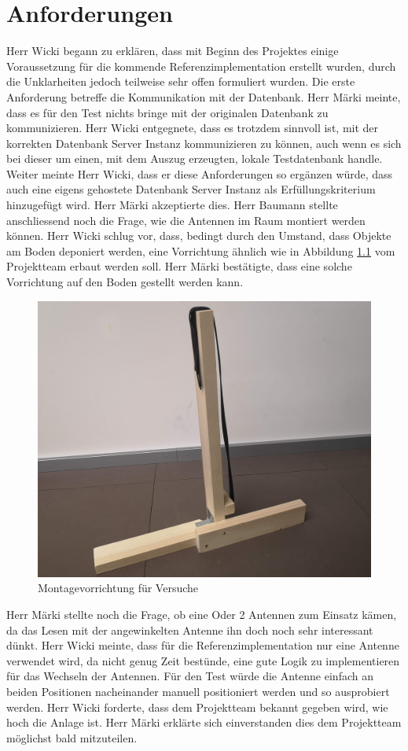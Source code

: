 \documentclass[parskip=full, a4paper]{scrreprt}
\begin{document}
\chapter{Anforderungen}
Herr Wicki begann zu erklären, dass mit Beginn des Projektes einige Voraussetzung für die kommende Referenzimplementation erstellt wurden, durch die Unklarheiten jedoch teilweise sehr offen formuliert wurden. Die erste Anforderung betreffe die Kommunikation mit der Datenbank. Herr Märki meinte, dass es für den Test nichts bringe mit der originalen Datenbank zu kommunizieren. Herr Wicki entgegnete, dass es trotzdem sinnvoll ist, mit der korrekten Datenbank Server Instanz kommunizieren zu können, auch wenn es sich bei dieser um einen, mit dem Auszug erzeugten, lokale Testdatenbank handle. Weiter meinte Herr Wicki, dass er diese Anforderungen so ergänzen würde, dass auch eine eigens gehostete Datenbank Server Instanz als Erfüllungskriterium hinzugefügt wird. Herr Märki akzeptierte dies.
Herr Baumann stellte anschliessend noch die Frage, wie die Antennen im Raum montiert werden können. Herr Wicki schlug vor, dass, bedingt durch den Umstand, dass Objekte am Boden deponiert werden, eine Vorrichtung ähnlich wie in Abbildung \ref{fig:montagevorrichtung} vom Projektteam erbaut werden soll. Herr Märki bestätigte, dass eine solche Vorrichtung auf den Boden gestellt werden kann.
\begin{figure}[htb]
	\centering
	\includegraphics[keepaspectratio,width=.7\linewidth]{img/Montagevorrichtung}
	\caption{Montagevorrichtung für Versuche}
	\label{fig:montagevorrichtung}
\end{figure}
Herr Märki stellte noch die Frage, ob eine Oder 2 Antennen zum Einsatz kämen, da das Lesen mit der angewinkelten Antenne ihn doch noch sehr interessant dünkt. Herr Wicki meinte, dass für die Referenzimplementation nur eine Antenne verwendet wird, da nicht genug Zeit bestünde, eine gute Logik zu implementieren für das Wechseln der Antennen. Für den Test würde die Antenne einfach an beiden Positionen nacheinander manuell positioniert werden und so ausprobiert werden.
Herr Wicki forderte, dass dem Projektteam bekannt gegeben wird, wie hoch die Anlage ist. Herr Märki erklärte sich einverstanden dies dem Projektteam möglichst bald mitzuteilen.
\end{document}
